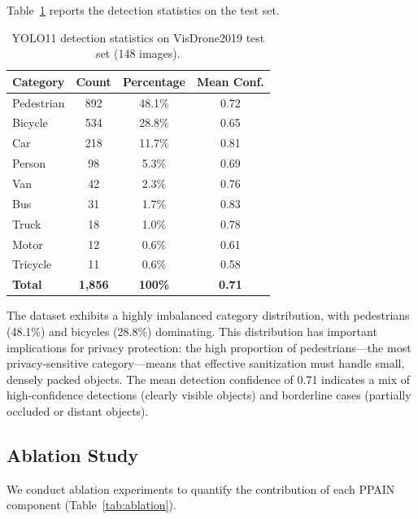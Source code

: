 \documentclass[preprint,12pt]{elsarticle}
\begin{document}
Table~\ref{tab:detection} reports the detection statistics on the test set.

\begin{table}[t]
\centering
\caption{YOLO11 detection statistics on VisDrone2019 test set (148 images).}
\label{tab:detection}
\begin{tabular}{lccc}
\toprule
\textbf{Category} & \textbf{Count} & \textbf{Percentage} & \textbf{Mean Conf.} \\
\midrule
Pedestrian & 892 & 48.1\% & 0.72 \\
Bicycle & 534 & 28.8\% & 0.65 \\
Car & 218 & 11.7\% & 0.81 \\
Person & 98 & 5.3\% & 0.69 \\
Van & 42 & 2.3\% & 0.76 \\
Bus & 31 & 1.7\% & 0.83 \\
Truck & 18 & 1.0\% & 0.78 \\
Motor & 12 & 0.6\% & 0.61 \\
Tricycle & 11 & 0.6\% & 0.58 \\
\midrule
\textbf{Total} & \textbf{1,856} & \textbf{100\%} & \textbf{0.71} \\
\bottomrule
\end{tabular}
\end{table}

The dataset exhibits a highly imbalanced category distribution, with pedestrians (48.1\%) and bicycles (28.8\%) dominating. This distribution has important implications for privacy protection: the high proportion of pedestrians---the most privacy-sensitive category---means that effective sanitization must handle small, densely packed objects. The mean detection confidence of 0.71 indicates a mix of high-confidence detections (clearly visible objects) and borderline cases (partially occluded or distant objects).

\subsection{Ablation Study}

We conduct ablation experiments to quantify the contribution of each PPAIN component (Table~\ref{tab:ablation}).
\end{document}
